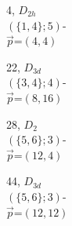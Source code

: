 \documentclass{beamer}
\begin{document}
\begin{frame}
\begin{figure}
\small
{\begin{center}
\begin{minipage}[b]{2.1cm}\centering
{}\par
4, $D_{2h}$\\
$(\{1, 4\};5)$-\\
$\vec{p}$=$(4,4)$
\end{minipage} 
\begin{minipage}[b]{2.1cm}
\centering
{}\par
22, $D_{3d}$\\
$(\{3,4\};4)$-\\
$\vec{p}$=$(8,16)$
\end{minipage}
%
\begin{minipage}[b]{21mm}
\centering
{}\par
 28, $D_2$\\
 $(\{5,6\};3)$-\\
$\vec{p}$=$(12,4)$
 \end{minipage}
\begin{minipage}[b]{2.2cm}\centering
{}\par
44, $D_{3d}$\\
$(\{5,6\};3)$-\\
$\vec{p}$=$(12,12)$
 \end{minipage}
\end{center}}
\vspace{2mm}


\end{figure}
\end{frame}
\end{document}
